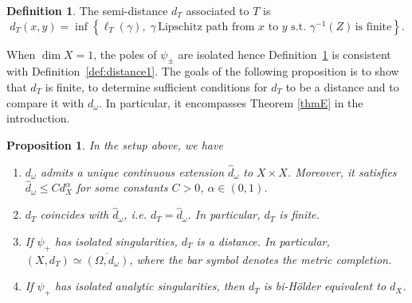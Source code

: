 \documentclass[a4paper,11pt,leqno,english]{smfart}
\theoremstyle{plain}
\theoremstyle{plain}
\numberwithin{equation}{section} %
\numberwithin{figure}{section} %
\theoremstyle{plain}
\newtheorem{prop}[thm]{Proposition} %
\theoremstyle{plain}
\theoremstyle{remark}
\theoremstyle{remark}
\theoremstyle{definition}
\theoremstyle{plain}
\theoremstyle{plain}
\theoremstyle{definition}
\newtheorem{defi}[thm]{Definition}
\renewcommand{\le}{\leq}
\begin{document}
\begin{defi} 
\label{def:distance2}
The semi-distance $d_{T}$ associated to $T$ is
$$
d_{T}(x,y)=\inf \left\{ \ell_{T}(\gamma), \; 
\gamma\, \text{Lipschitz path from } x \text{ to } y \,\, \mbox{s.t.} \, \,\gamma^{-1}(Z) \, \mbox{is finite} \right\}.
$$
\end{defi} 

When $\dim X=1$, the poles of $\psi_\pm$ are isolated hence Definition~\ref{def:distance2} is consistent with Definition~\ref{def:distance1}. The goals of the following proposition is to show that $d_T$ is finite, to determine sufficient conditions for $d_T$ to be a distance and to compare it with $d_\omega$. In particular, it encompasses Theorem \ref{thmE} in the introduction.

\begin{prop}
\label{prop dT}
In the setup above, we have
\begin{enumerate}[label=$(\roman*)$]
\item $d_{\omega}$ admits a unique continuous extension $\hat d_{\omega}$ to $X\times X$. Moreover, it satisfies 
$\hat d_{\omega} \le C d_X^\alpha$
for some constants $C>0$, $\alpha\in (0,1)$. 
\item $d_{T}$ coincides with $\hat d_{\omega}$, i.e.  $d_{T} = \hat d_{\omega}$. In particular, $d_{T}$ is finite.  
\item If $\psi_+$ has isolated singularities, $d_{T}$ is a distance. In particular, $(X, d_T)\simeq \overline{(\Omega, d_{\omega})}$, where the bar symbol denotes the metric completion. 
\item If $\psi_+$ has isolated analytic singularities, then $d_T$ is bi-Hölder equivalent to $d_X$.
\end{enumerate}
\end{prop}
\end{document}
